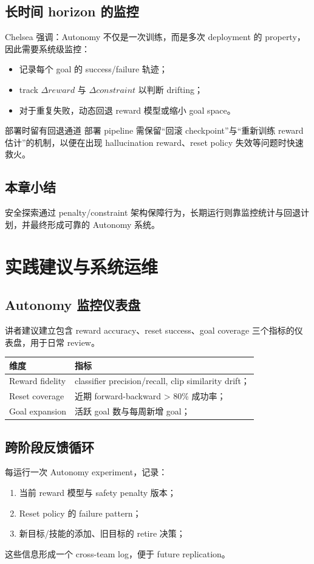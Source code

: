 \documentclass[a4paper]{article}
\begin{document}
\subsection{长时间 horizon 的监控}
Chelsea 强调：Autonomy 不仅是一次训练，而是多次 deployment 的 property，因此需要系统级监控：
\begin{itemize}
\item 记录每个 goal 的 success/failure 轨迹；
\item track $\Delta reward$ 与 $\Delta constraint$ 以判断 drifting；
\item 对于重复失败，动态回退 reward 模型或缩小 goal space。
\end{itemize}

\begin{warningbox}{部署时留有回退通道}
部署 pipeline 需保留“回滚 checkpoint”与“重新训练 reward 估计”的机制，以便在出现 hallucination reward、reset policy 失效等问题时快速救火。
\end{warningbox}

\subsection{本章小结}
安全探索通过 penalty/constraint 架构保障行为，长期运行则靠监控统计与回退计划，并最终形成可靠的 Autonomy 系统。
\newpage

\section{实践建议与系统运维}
\subsection{Autonomy 监控仪表盘}
讲者建议建立包含 reward accuracy、reset success、goal coverage 三个指标的仪表盘，用于日常 review。
\begin{tabularx}{\textwidth}{lX}
\toprule
维度 & 指标 \\
\midrule
Reward fidelity & classifier precision/recall, clip similarity drift； \\
Reset coverage & 近期 forward-backward > 80\% 成功率； \\
Goal expansion & 活跃 goal 数与每周新增 goal； \\
\bottomrule
\end{tabularx}

\subsection{跨阶段反馈循环}
每运行一次 Autonomy experiment，记录：
\begin{enumerate}
\item 当前 reward 模型与 safety penalty 版本；
\item Reset policy 的 failure pattern；
\item 新目标/技能的添加、旧目标的 retire 决策；
\end{enumerate}
这些信息形成一个 cross-team log，便于 future replication。
\end{document}

